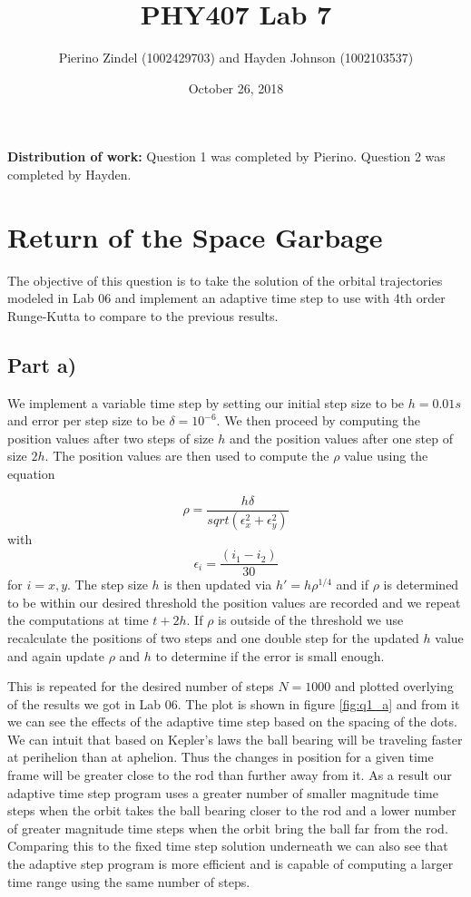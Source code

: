 \documentclass{article}
\title{PHY407 Lab 7}
\author{Pierino Zindel (1002429703) and Hayden Johnson (1002103537)}
\date{October 26, 2018}
\begin{document}
\maketitle

\noindent \textbf{Distribution of work:} Question 1 was completed by Pierino. Question 2 was completed by Hayden.

\section{Return of the Space Garbage}

The objective of this question is to take the solution of the orbital trajectories modeled in Lab 06 and implement an adaptive time step to use with 4th order Runge-Kutta to compare to the previous results.

\subsection{Part a)}
We implement a variable time step by setting our initial step size to be $h=0.01s$ and error per step size to be $\delta=10^{-6}$. We then proceed by computing the position values after two steps of size $h$ and the position values after one step of size $2h$. The position values are then used to compute the $\rho$ value using the equation

\begin{equation}
	\rho = \frac{h\delta}{sqrt(\epsilon_x^2 + \epsilon_y^2)}
\end{equation}
with 
\begin{equation}
	\epsilon_i = \frac{(i_1-i_2)}{30}
\end{equation}
for $i=x,y$.
The step size $h$ is then updated via $h\prime = h\rho^{1/4}$ and if $\rho$ is determined to be within our desired threshold the position values are recorded and we repeat the computations at time $t+2h$. If $\rho$ is outside of the threshold we use recalculate the positions of two steps and one double step for the updated $h$ value and again update $\rho$ and $h$ to determine if the error is small enough.

This is repeated for the desired number of steps $N=1000$ and plotted overlying of the results we got in Lab 06. The plot is shown in figure \ref{fig:q1_a} and from it we can see the effects of the adaptive time step based on the spacing of the dots. We can intuit that based on Kepler's laws the ball bearing will be traveling faster at perihelion than at aphelion. Thus the changes in position for a given time frame will be greater close to the rod than further away from it. As a result our adaptive time step program uses a greater number of smaller magnitude time steps when the orbit takes the ball bearing closer to the rod and a lower number of greater magnitude time steps when the orbit bring the ball far from the rod. Comparing this to the fixed time step solution underneath we can also see that the adaptive step program is more efficient and is capable of computing a larger time range using the same number of steps. 
\end{document}

